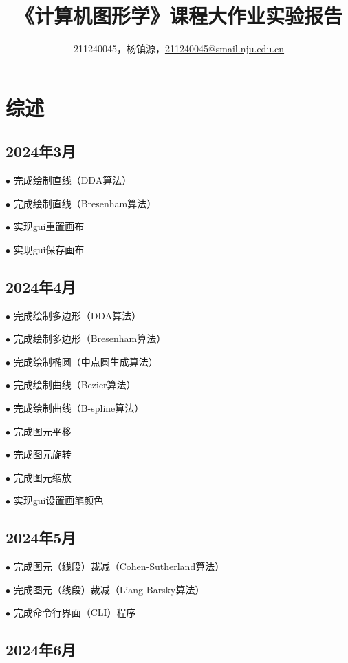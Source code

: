 \documentclass[a4paper,UTF8]{article}
\theoremstyle{definition}
\begin{document}
\title{\textbf{《计算机图形学》课程大作业实验报告}}
\author{211240045，杨镇源，\href{mailto:211240045@smail.nju.edu.cn}{211240045@smail.nju.edu.cn}}
\maketitle
\tableofcontents 
\newpage
\section{综述}

\subsection{2024年3月}

$\bullet$ 完成绘制直线（DDA算法）

$\bullet$ 完成绘制直线（Bresenham算法）

$\bullet$ 实现gui重置画布

$\bullet$ 实现gui保存画布

\subsection{2024年4月}

$\bullet$ 完成绘制多边形（DDA算法）

$\bullet$ 完成绘制多边形（Bresenham算法）

$\bullet$ 完成绘制椭圆（中点圆生成算法）

$\bullet$ 完成绘制曲线（Bezier算法）

$\bullet$ 完成绘制曲线（B-spline算法）

$\bullet$ 完成图元平移

$\bullet$ 完成图元旋转

$\bullet$ 完成图元缩放

$\bullet$ 实现gui设置画笔颜色

\subsection{2024年5月}

$\bullet$ 完成图元（线段）裁减（Cohen-Sutherland算法）

$\bullet$ 完成图元（线段）裁减（Liang-Barsky算法）

$\bullet$ 完成命令行界面（CLI）程序

\subsection{2024年6月}
\end{document}
